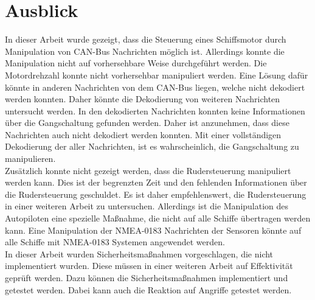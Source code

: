 \section{Ausblick}
In dieser Arbeit wurde gezeigt, dass die Steuerung eines Schiffsmotor durch Manipulation von CAN-Bus Nachrichten möglich ist.
Allerdings konnte die Manipulation nicht auf vorhersehbare Weise durchgeführt werden. Die Motordrehzahl konnte nicht
vorhersehbar manipuliert werden. Eine Lösung dafür könnte in anderen Nachrichten von dem CAN-Bus liegen, welche nicht
dekodiert werden konnten. Daher könnte die Dekodierung von weiteren Nachrichten untersucht werden.
In den dekodierten Nachrichten konnten keine Informationen über die Gangschaltung gefunden werden. Daher ist anzunehmen,
dass diese Nachrichten auch nicht dekodiert werden konnten. Mit einer vollständigen Dekodierung der aller Nachrichten,
ist es wahrscheinlich, die Gangschaltung zu manipulieren. \\
Zusätzlich konnte nicht gezeigt werden, dass die Rudersteuerung manipuliert werden kann. Dies ist der begrenzten Zeit
und den fehlenden Informationen über die Rudersteuerung geschuldet. Es ist daher empfehlenswert, die Rudersteuerung
in einer weiteren Arbeit zu untersuchen. 
Allerdings ist die Manipulation des Autopiloten eine spezielle Maßnahme, die nicht auf alle Schiffe übertragen werden kann. 
Eine Manipulation der NMEA-0183 Nachrichten der Sensoren könnte auf alle Schiffe mit NMEA-0183 Systemen angewendet werden.
\\
In dieser Arbeit wurden Sicherheitsmaßnahmen vorgeschlagen, die nicht implementiert wurden. Diese müssen in einer weiteren
Arbeit auf Effektivität geprüft werden. Dazu können die Sicherheitsmaßnahmen implementiert und getestet werden.
Dabei kann auch die Reaktion auf Angriffe getestet werden. \\